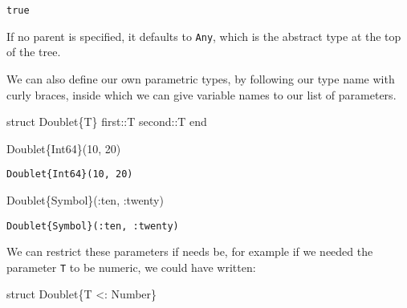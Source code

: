 \documentclass[
  letterpaper,
  DIV=11,
  numbers=noendperiod]{scrreprt}
\newenvironment{Shaded}{\begin{snugshade}}{\end{snugshade}}
\newcommand{\DataTypeTok}[1]{\textcolor[rgb]{0.68,0.00,0.00}{#1}}
\newcommand{\FloatTok}[1]{\textcolor[rgb]{0.68,0.00,0.00}{#1}}
\newcommand{\FunctionTok}[1]{\textcolor[rgb]{0.28,0.35,0.67}{#1}}
\newcommand{\KeywordTok}[1]{\textcolor[rgb]{0.00,0.23,0.31}{#1}}
\newcommand{\NormalTok}[1]{\textcolor[rgb]{0.00,0.23,0.31}{#1}}
\newcommand{\OperatorTok}[1]{\textcolor[rgb]{0.37,0.37,0.37}{#1}}
\begin{document}
\begin{verbatim}
true
\end{verbatim}

If no parent is specified, it defaults to \texttt{Any}, which is the
abstract type at the top of the tree.

We can also define our own parametric types, by following our type name
with curly braces, inside which we can give variable names to our list
of parameters.

\begin{Shaded}
\begin{Highlighting}[]
\KeywordTok{struct}\NormalTok{ Doublet\{T\}}
\NormalTok{    first}\OperatorTok{::}\DataTypeTok{T}
\NormalTok{    second}\OperatorTok{::}\DataTypeTok{T}
\KeywordTok{end}
\end{Highlighting}
\end{Shaded}

\begin{Shaded}
\begin{Highlighting}[]
\FunctionTok{Doublet}\DataTypeTok{\{Int64\}}\NormalTok{(}\FloatTok{10}\NormalTok{, }\FloatTok{20}\NormalTok{)}
\end{Highlighting}
\end{Shaded}

\begin{verbatim}
Doublet{Int64}(10, 20)
\end{verbatim}

\begin{Shaded}
\begin{Highlighting}[]
\FunctionTok{Doublet}\DataTypeTok{\{Symbol\}}\NormalTok{(}\OperatorTok{:}\NormalTok{ten, }\OperatorTok{:}\NormalTok{twenty)}
\end{Highlighting}
\end{Shaded}

\begin{verbatim}
Doublet{Symbol}(:ten, :twenty)
\end{verbatim}

We can restrict these parameters if needs be, for example if we needed
the parameter \texttt{T} to be numeric, we could have written:

\begin{Shaded}
\begin{Highlighting}[]
\KeywordTok{struct}\NormalTok{ Doublet\{T }\OperatorTok{\textless{}:}\DataTypeTok{ Number}\NormalTok{\}}
\end{Highlighting}
\end{Shaded}
\end{document}
